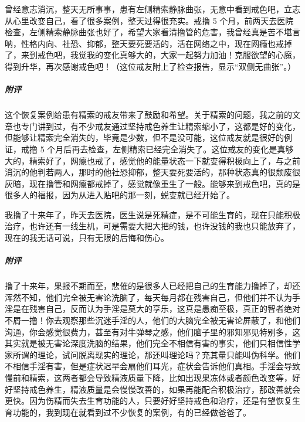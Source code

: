 \begin{case}
    曾经意志消沉，整天无所事事，患有左侧精索静脉曲张，无意中看到戒色吧，立志从心里改变自己，看了很多案例，整天过得很充实。戒撸 5 个月，前两天去医院检查，左侧精索静脉曲张也好了，希望大家看清撸管的危害，我曾经真是苦不堪言呐，性格内向、社恐、抑郁，整天要死要活的，活在网络之中，现在网瘾也戒掉了，来到戒色吧，我觉我的变化真够大的，大家一起努力加油！克服欲望的心魔，得到升华，再次感谢戒色吧！（这位戒友附上了检查报告，显示“双侧无曲张”。）
    \subparagraph{附评} 这个恢复案例给患有精索的戒友带来了鼓励和希望。关于精索的问题，我之前的文章也专门讲到过，有不少戒友通过坚持戒色养生让精索缩小了，这都是好的变化，但能够让精索完全消失的，毕竟是少数，但不是没可能，这位戒友就是很好的例证，戒撸 5 个月后再去检查，左侧精索已经完全消失了。这位戒友的变化是真够大的，精索好了，网瘾也戒了，感觉他的能量状态一下就变得积极向上了，与之前消沉的他判若两人，那时的他社恐抑郁，整天要死要活的，那种状态真的很颓废很灰暗，现在撸管和网瘾都戒掉了，感觉就像重生了一般。能够来到戒色吧，真的是很多人的福报，因为从进入贴吧的那一刻，蜕变就已经开始了。
\end{case}

\begin{case}
    我撸了十来年了，昨天去医院，医生说是死精症，是不可能生育的，现在只能积极治疗，也许还有一线生机，可是需要大把大把的钱，也许没钱的我也只能放弃了，现在的我无话可说，只有无限的后悔和伤心。
    \subparagraph{附评} 撸了十来年，果报不期而至，悲催的是很多人已经把自己的生育能力撸掉了，却还浑然不知，他们完全被无害论洗脑了，每天每月都在残害自己，但他们并不认为手淫是在残害自己，反而认为手淫是莫大的享乐，这真是愚痴至极，真正的智者绝对不屑一撸！你去观察那些沉迷手淫的人，他们的大脑完全被无害论屏蔽了，和他们沟通，你会感觉很费力，甚至有对牛弹琴之感，他们脑子里的邪知邪见特别多，这其实就是被无害论深度洗脑的结果，他们完全不相信有害的事实，他们只相信性学家所谓的理论，试问脱离现实的理论，那还叫理论吗？充其量只能叫伪科学。他们不相信手淫有害，但是症状迟早会扇他们耳光，症状会告诉他们真相。手淫会导致慢前和精索，这两者都会导致精液质量下降，比如出现果冻体或者颜色改变等，好好坚持戒色养生，精液质量是会慢慢改善的，如果再能配合积极治疗，那改善就会更快。因为伤精而失去生育功能的人，只要好好坚持戒色和治疗，还是有望恢复生育功能的，我到现在就看到过不少恢复的案例，有的已经做爸爸了。
\end{case}

